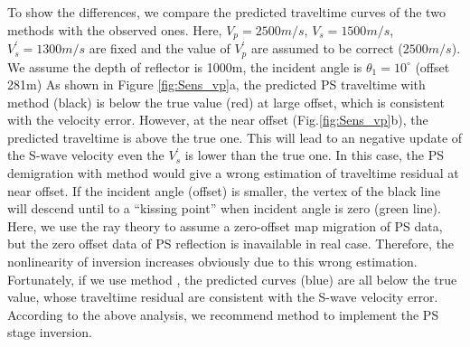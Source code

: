 \documentclass[extra,mreferee]{gji}
\newcommand{\Rome}[1]{{\bf\uppercase\expandafter{\romannumeral #1\relax}}}
\begin{document}
To show the differences, we compare the predicted traveltime
curves of the two methods with the observed ones.
Here, $V_p=2500m/s$, $V_s=1500m/s$, $V^{'}_s=1300m/s$ are fixed and the value of $V^{'}_p$
are assumed to be correct ($2500m/s$). We assume the depth of reflector is 1000m, the
incident angle is $\theta_1=10^{\circ}$ (offset 281m)
As shown in Figure \ref{fig:Sens_vp}a, 
the predicted PS traveltime with method
\Rome{1} (black) is below the true value (red) at large offset, which is consistent
with the velocity error. However, at the near offset (Fig.\ref{fig:Sens_vp}b), the predicted traveltime is
above the true one. 
This will lead to an negative update of the S-wave velocity even the $V^{'}_s$ is
lower than the true one.
In this case, the PS demigration with method \Rome{1} 
would give a wrong estimation of traveltime residual at near offset.
If the incident angle (offset) is smaller, the vertex of the black line will descend
until to a ``kissing point'' when incident angle is zero (green line).
Here, we use the ray theory to assume a zero-offset map migration of PS data, but the
zero offset data of PS reflection is inavailable in real case.
Therefore, the nonlinearity of inversion increases obviously due to this wrong
estimation. 
Fortunately, if we use method \Rome{2},
the predicted curves (blue) are all below the true value, whose traveltime residual are consistent
with the S-wave velocity error.
According to the above analysis, we recommend method \Rome{2} to implement the PS stage inversion.
\clearpage
\end{document}
